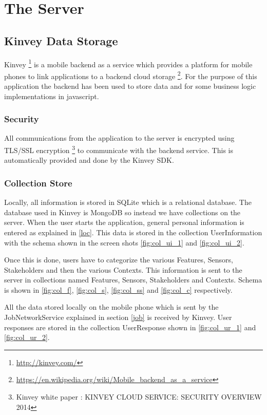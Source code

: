 \section{The Server}

\subsection{Kinvey Data Storage}

Kinvey \footnote{\url{http://kinvey.com/}} is a mobile backend as a service which provides a platform for mobile phones to link applications to a backend cloud storage \footnote{\url{https://en.wikipedia.org/wiki/Mobile_backend_as_a_service}}. For the purpose of this application the backend has been used to store data and for some business logic implementations in javascript.

\subsubsection{Security}

All communications from the application to the server is encrypted using TLS/SSL encryption \footnote{Kinvey white paper : KINVEY CLOUD
SERVICE: SECURITY
OVERVIEW 2014} to communicate with the backend service. This is automatically provided and done by the Kinvey SDK.

\subsubsection{Collection Store}

Locally, all information is stored in SQLite which is a relational database. The database used in Kinvey is MongoDB so instead we have collections 
on the server.
When the user starts the application, general personal information is entered as explained in \ref{loc}. This data is stored in the
collection UserInformation with the schema shown in the screen shots \ref{fig:col_ui_1} and \ref{fig:col_ui_2}.

Once this is done, users have to categorize the various Features, Sensors, Stakeholders and then the various Contexts. This information is sent to the server in collections named Features, Sensors, Stakeholders and Contexts. Schema is shown in \ref{fig:col_f}, \ref{fig:col_s}, \ref{fig:col_ss} and \ref{fig:col_c} respectively.

All the data stored locally on the mobile phone which is sent by the JobNetworkService explained in section \ref{job} is received by Kinvey.
User responses are stored in the collection UserResponse shown in \ref{fig:col_ur_1} and \ref{fig:col_ur_2}.

